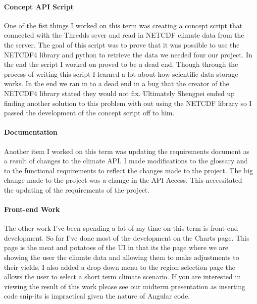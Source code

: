 \documentclass[onecolumn, draftclsnofoot,10pt, compsoc]{article}
\begin{document}
		\paragraph{Concept API Script} \hfill \break
		One of the fist things I worked on this term was creating a concept script that connected with the Thredds sever and read in NETCDF climate data from the the server. The goal of this script was to prove that it was possible to use the NETCDF4 library and python to retrieve the data we needed four our project. In the end the script I worked on proved to be a dead end. Though through the process of writing this script I learned a lot about how scientific data storage works. In the end we ran in to a dead end in a bug that the creator of the NETCDF4 library stated they would not fix. Ultimately Shengpei ended up finding another solution to this problem with out using the NETCDF library so I passed the development of the concept script off to him.\\

		\paragraph{Documentation} \hfill \break
		Another item I worked on this term was updating the requirements document as a result of changes to the climate API. I made modifications to the glossary and to the functional requirements to reflect the changes made to the project. The big change made to the project was a change in the API Access. This necessitated the updating of the requirements of the project.\\


		\paragraph{Front-end Work} \hfill \break
		The other work I've been spending a lot of my time on this term is front end development. So far I've done most of the development on the Charts page. This page is the meat and potatoes of the UI in that its the page where we are showing the user the climate data and allowing them to make adjustments to their yields. I also added a drop down menu to the region selection page the allows the user to select a short term climate scenario. If you are interested in viewing the result of this work please see our midterm presentation as inserting code snip-its is impractical given the nature of Angular code.
\end{document}

